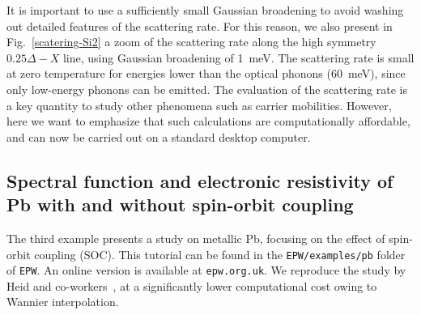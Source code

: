 \documentclass[final,3p,times,twocolumn]{elsarticle}
\begin{document}
It is important to use a sufficiently small Gaussian broadening to avoid washing out detailed features of the scattering rate. For this reason, we also present in Fig.~\ref{scatering-Si2} a zoom of the scattering rate along the high symmetry $0.25\Delta-X$ line, using Gaussian broadening of 1~meV.     
The scattering rate is small at zero temperature for energies lower than the optical phonons (60~meV), since only low-energy phonons can be emitted. 
The evaluation of the scattering rate is a key quantity to study other phenomena such as carrier mobilities. However, here we want to emphasize that such calculations are computationally affordable, and can now be carried out on a standard desktop computer. 

  
\subsection{Spectral function and electronic resistivity of Pb with and without spin-orbit coupling}

The third example presents a study on metallic Pb, focusing on the effect of spin-orbit coupling (SOC). This tutorial can be found in the \texttt{EPW/examples/pb} folder of \texttt{EPW}. An online version is available at \texttt{epw.org.uk}. 
We reproduce the study by Heid and co-workers~\cite{Heid2010}, at a significantly lower computational cost owing to Wannier interpolation. 
\end{document}
